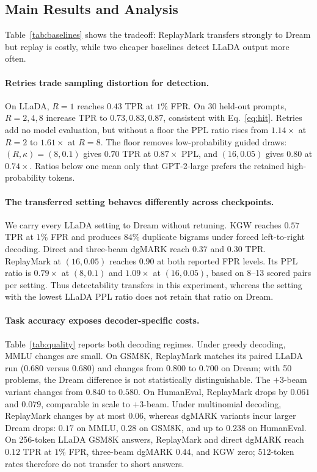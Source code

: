 

\subsection{Main Results and Analysis}
\label{sec:mainresults}

Table~\ref{tab:baselines} shows the tradeoff: ReplayMark transfers strongly to Dream but replay is
costly, while two cheaper baselines detect LLaDA output more often.

\paragraph{Retries trade sampling distortion for detection.}
On LLaDA, $R=1$ reaches $0.43$ TPR at $1\%$ FPR. On 30 held-out prompts, $R=2,4,8$ increase
TPR to $0.73,0.83,0.87$, consistent with Eq.~\eqref{eq:hit}. Retries add no model evaluation,
but without a floor the PPL ratio rises from $1.14\times$ at $R=2$ to $1.61\times$ at $R=8$.
The floor removes low-probability guided draws: $(R,\kappa)=(8,0.1)$ gives $0.70$ TPR at
$0.87\times$ PPL, and $(16,0.05)$ gives $0.80$ at $0.74\times$. Ratios below one mean only that
GPT-2-large prefers the retained high-probability tokens.

\paragraph{The transferred setting behaves differently across checkpoints.}
We carry every LLaDA setting to Dream without retuning. KGW reaches $0.57$ TPR at $1\%$ FPR
and produces $84\%$ duplicate bigrams under forced left-to-right decoding. Direct and three-beam
dgMARK reach $0.37$ and $0.30$ TPR. ReplayMark at $(16,0.05)$ reaches $0.90$ at both reported
FPR levels. Its PPL ratio is $0.79\times$ at $(8,0.1)$ and $1.09\times$ at $(16,0.05)$, based
on 8--13 scored pairs per setting. Thus detectability transfers in this experiment, whereas the
setting with the lowest LLaDA PPL ratio does not retain that ratio on Dream.

\paragraph{Task accuracy exposes decoder-specific costs.}
Table~\ref{tab:quality} reports both decoding regimes. Under greedy decoding, MMLU changes are
small. On GSM8K, ReplayMark matches its paired LLaDA run ($0.680$ versus $0.680$) and changes
from $0.800$ to $0.700$ on Dream; with 50 problems, the Dream difference is not statistically
distinguishable. The $+3$-beam variant changes from $0.840$ to $0.580$. On HumanEval,
ReplayMark drops by $0.061$ and $0.079$, comparable in scale to $+3$-beam. Under multinomial
decoding, ReplayMark changes by at most $0.06$, whereas dgMARK variants incur larger Dream
drops: $0.17$ on MMLU, $0.28$ on GSM8K, and up to $0.238$ on HumanEval.
On 256-token LLaDA GSM8K answers, ReplayMark and direct dgMARK reach $0.12$ TPR at $1\%$ FPR,
three-beam dgMARK $0.44$, and KGW zero; 512-token rates therefore do not transfer to short answers.

